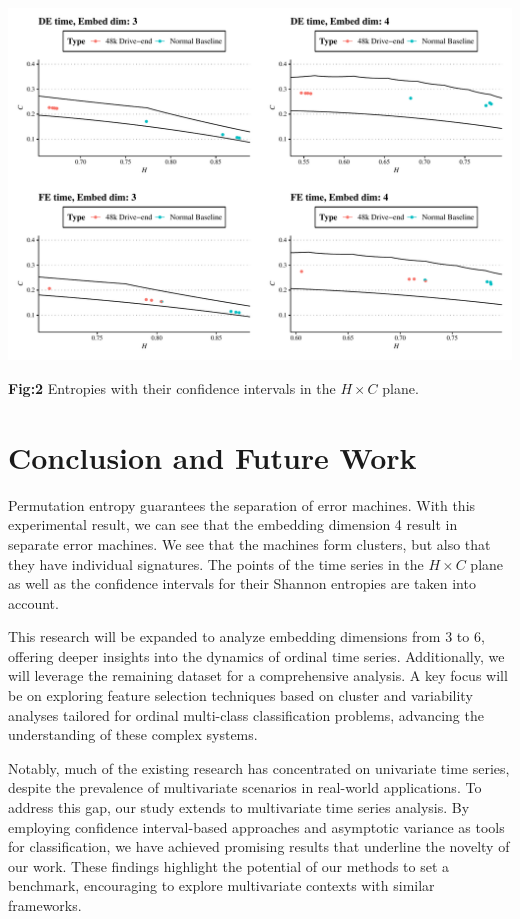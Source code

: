 \documentclass[a0,portrait]{a0poster}
\begin{document}
\begin{mdframed}[style=MyFrame]
\begin{multicols}{2}
\begin{minipage}{\columnwidth}
    \includegraphics[width=0.9\columnwidth]{confidence_interval.pdf}
    
 \textbf{Fig:2} Entropies with their confidence intervals in the $H\times C$ plane.
\end{minipage}

\section{Conclusion and Future Work} \label{section4}

Permutation entropy guarantees the separation of error machines. With this experimental result, we can see that the embedding dimension 4 result in separate error machines. We see that the machines form clusters, but also that they have individual signatures. The points of the time series in the $H \times C$ plane as well as the confidence intervals for their Shannon entropies are taken into account.

This research will be expanded to analyze embedding dimensions from 3 to 6, offering deeper insights into the dynamics of ordinal time series. Additionally, we will leverage the remaining dataset for a comprehensive analysis. A key focus will be on exploring feature selection techniques based on cluster and variability analyses tailored for ordinal multi-class classification problems, advancing the understanding of these complex systems.

Notably, much of the existing research has concentrated on univariate time series, despite the prevalence of multivariate scenarios in real-world applications. To address this gap, our study extends to multivariate time series analysis. By employing confidence interval-based approaches and asymptotic variance as tools for classification, we have achieved promising results that underline the novelty of our work. These findings highlight the potential of our methods to set a benchmark, encouraging to explore multivariate contexts with similar frameworks.


\end{multicols}
\end{mdframed}
\end{document}
